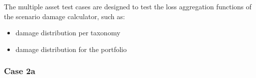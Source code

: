 The multiple asset test cases are designed to test the loss aggregation functions of the scenario damage calculator, such as:

\begin{itemize}
\item damage distribution per taxonomy
\item damage distribution for the portfolio
\end{itemize}

\subsubsection{Case 2a}



